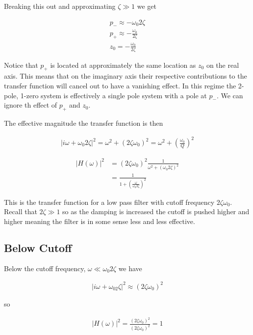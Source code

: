 \documentclass[12pt]{article}
\begin{document}
Breaking this out and approximating $\zeta \gg 1$ we get

\begin{align}
p_- \approx -\omega_0 2\zeta\\
p_+ \approx -\frac{\omega_0}{2\zeta}\\
z_0 = -\frac{\omega_0}{2\zeta}
\end{align}

Notice that $p_+$ is located at approximately the same location as $z_0$ on the real axis. This means that on the imaginary axis their respective contributions to the transfer function will cancel out to have a vanishing effect. In this regime the 2-pole, 1-zero system is effectively a single pole system with a pole at $p_-$. We can ignore th effect of $p_+$ and $z_0$.

The effective magnitude the transfer function is then

\begin{align}
|i\omega + \omega_0 2 \zeta|^2 = \omega^2 + (2\zeta \omega_0)^2 = \omega^2 + \left(\frac{\omega_0}{Q}\right)^2 
\end{align}

\begin{align}
|H(\omega)|^2 &= (2\zeta \omega_0)^2 \frac{1}{\omega^2 + (\omega_0 2 \zeta)^2}\\
&= \frac{1}{1 + \left(\frac{\omega}{\omega_0 2 \zeta}\right)^2}
\end{align}

This is the transfer function for a low pass filter with cutoff frequency $2\zeta \omega_0$. Recall that $2\zeta \gg 1$ so as the damping is increased the cutoff is pushed higher and higher meaning the filter is in some sense less and less effective.

\subsection{Below Cutoff}

Below the cutoff frequency, $\omega \ll \omega_0 2 \zeta$ we have

\begin{align}
|i\omega + \omega_02\zeta|^2 \approx (2\zeta \omega_0)^2
\end{align}

so

\begin{align}
|H(\omega)|^2 = \frac{(2\zeta\omega_0)^2}{(2\zeta \omega_0)^2} = 1
\end{align}
\end{document}
